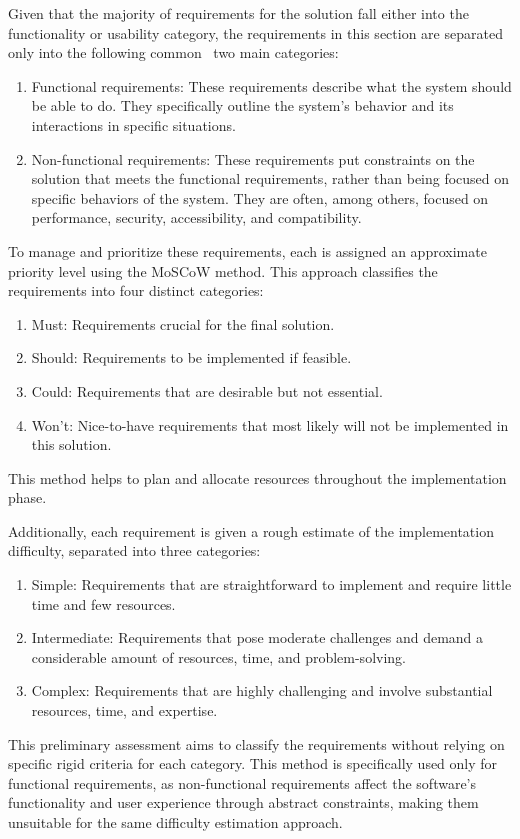Given that the majority of requirements for the solution fall either into the functionality or usability category, the requirements in this section are separated only into the following common~\cite{Aurum2005} two main categories:
\begin{enumerate}
    \item Functional requirements: These requirements describe what the system should be able to do. They specifically outline the system's behavior and its interactions in specific situations.
    \item Non-functional requirements: These requirements put constraints on the solution that meets the functional requirements, rather than being focused on specific behaviors of the system. They are often, among others, focused on performance, security, accessibility, and compatibility.
\end{enumerate}

To manage and prioritize these requirements, each is assigned an approximate priority level using the MoSCoW method. This approach classifies the requirements into four distinct categories:
\begin{enumerate}
    \item Must: Requirements crucial for the final solution.
    \item Should: Requirements to be implemented if feasible.
    \item Could: Requirements that are desirable but not essential.
    \item Won't: Nice-to-have requirements that most likely will not be implemented in this solution.
\end{enumerate}
This method helps to plan and allocate resources throughout the implementation phase.~\cite{Stephens2023}

\break
Additionally, each requirement is given a rough estimate of the implementation difficulty, separated into three categories: \nopagebreak
\begin{enumerate}
    \item Simple: Requirements that are straightforward to implement and require little time and few resources.
    \item Intermediate: Requirements that pose moderate challenges and demand a considerable amount of resources, time, and problem-solving.
    \item Complex: Requirements that are highly challenging and involve substantial resources, time, and expertise.
\end{enumerate}
This preliminary assessment aims to classify the requirements without relying on specific rigid criteria for each category. This method is specifically used only for functional requirements, as non-functional requirements affect the software's functionality and user experience through abstract constraints, making them unsuitable for the same difficulty estimation approach.
